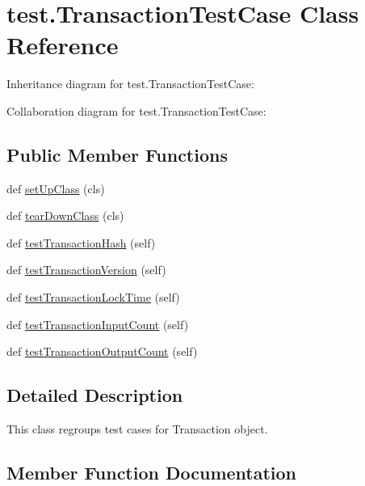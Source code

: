\hypertarget{classtest_1_1TransactionTestCase}{}\section{test.\+Transaction\+Test\+Case Class Reference}
\label{classtest_1_1TransactionTestCase}


Inheritance diagram for test.\+Transaction\+Test\+Case\+:


Collaboration diagram for test.\+Transaction\+Test\+Case\+:
\subsection*{Public Member Functions}
\begin{DoxyCompactItemize}
\item 
def \hyperlink{classtest_1_1TransactionTestCase_afe834e0183de1164a197f35f1185200d}{set\+Up\+Class} (cls)
\item 
def \hyperlink{classtest_1_1TransactionTestCase_ab3f30efe6bcf4c23e1ac90d215e1e378}{tear\+Down\+Class} (cls)
\item 
def \hyperlink{classtest_1_1TransactionTestCase_ab0c0cd290e6c74dbbb39b429d3703647}{test\+Transaction\+Hash} (self)
\item 
def \hyperlink{classtest_1_1TransactionTestCase_a5bb9f55b9b0e989c429f5201821f3ba8}{test\+Transaction\+Version} (self)
\item 
def \hyperlink{classtest_1_1TransactionTestCase_a88007462b14e10906a5315772a632820}{test\+Transaction\+Lock\+Time} (self)
\item 
def \hyperlink{classtest_1_1TransactionTestCase_aa00ca7973d7216352448a77103d37b41}{test\+Transaction\+Input\+Count} (self)
\item 
def \hyperlink{classtest_1_1TransactionTestCase_a742446a6ac0f0639318e31db787b2f0c}{test\+Transaction\+Output\+Count} (self)
\end{DoxyCompactItemize}


\subsection{Detailed Description}
\begin{DoxyVerb}This class regroups test cases for Transaction object.\end{DoxyVerb}
 

\subsection{Member Function Documentation}
\hypertarget{classtest_1_1TransactionTestCase_afe834e0183de1164a197f35f1185200d}{}
